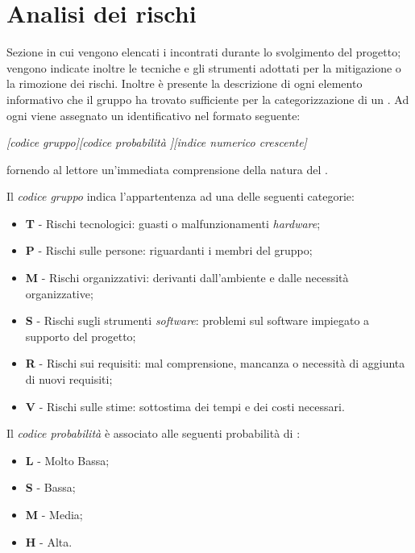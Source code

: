\section{Analisi dei rischi} 
Sezione in cui vengono elencati i  incontrati durante lo svolgimento del progetto; vengono indicate inoltre le tecniche e gli strumenti adottati per la mitigazione o la rimozione dei rischi. Inoltre \`e presente la descrizione di ogni elemento informativo che il gruppo ha trovato sufficiente per la categorizzazione di un .
Ad ogni  viene assegnato un identificativo nel formato seguente: 

\begin{center}
\textit{[codice gruppo][codice probabilit\`a ][indice numerico crescente]}  
\end{center}

fornendo al lettore un'immediata comprensione della natura del .

Il \textit{codice gruppo} indica l'appartentenza ad una delle seguenti categorie:
\begin{itemize}
\item \textbf{T} - Rischi tecnologici: guasti o malfunzionamenti \textit{hardware};
\item \textbf{P} - Rischi sulle persone: riguardanti i membri del gruppo;
\item \textbf{M} - Rischi organizzativi: derivanti dall'ambiente e dalle necessit\`a organizzative;
\item \textbf{S} - Rischi sugli strumenti \textit{software}: problemi sul software impiegato a supporto del progetto;
\item \textbf{R} - Rischi sui requisiti: mal comprensione, mancanza o necessit\`a di aggiunta di nuovi requisiti;
\item \textbf{V} - Rischi sulle stime: sottostima dei tempi e dei costi necessari.
\end{itemize}

Il \textit{codice probabilit\`a } \`e associato alle seguenti probabilit\`a di : 
\begin{itemize}
\item \textbf{L} - Molto Bassa;
\item \textbf{S} - Bassa;
\item \textbf{M} - Media;
\item \textbf{H} - Alta.
\end{itemize}

